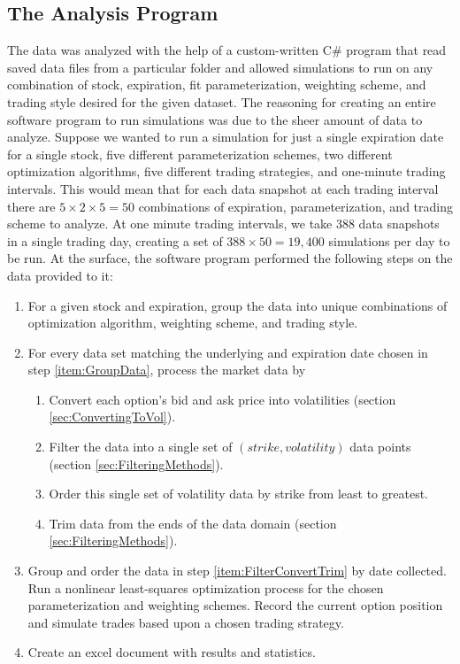 \documentclass[12pt, a4paper, notitlepage]{article}
\numberwithin{equation}{subsection}
\numberwithin{figure}{subsection}
\numberwithin{table}{subsection}
\newcommand{\newpar}{\newline \newline}
\begin{document}
\subsection{The Analysis Program}
The data was analyzed with the help of a custom-written C\# program that read saved data files from a particular folder and allowed simulations to run on any combination of stock, expiration, fit parameterization, weighting scheme, and trading style desired for the given dataset.
\newpar
The reasoning for creating an entire software program to run simulations was due to the sheer amount of data to analyze.  Suppose we wanted to run a simulation for just a single expiration date for a single stock, five different parameterization schemes, two different optimization algorithms, five different trading strategies, and one-minute trading intervals.  This would mean that for each data snapshot at each trading interval there are $5 \times 2 \times 5 = 50$ combinations of expiration, parameterization, and trading scheme to analyze.  At one minute trading intervals, we take 388 data snapshots in a single trading day, creating a set of $388 \times 50 = 19,400$ simulations per day to be run.
\newpar
At the surface, the software program performed the following steps on the data provided to it:
\begin{enumerate}
	\item For a given stock and expiration, group the data into unique combinations of optimization algorithm, weighting scheme, and trading style.\label{item:GroupData}
    \item For every data set matching the underlying and expiration date chosen in step \ref{item:GroupData}, process the market data by
    \begin{enumerate}
    	 \item Convert each option's bid and ask price into volatilities (section \ref{sec:ConvertingToVol}).
         \item Filter the data into a single set of $(strike, volatility)$ data points (section \ref{sec:FilteringMethods}).
         \item Order this single set of volatility data by strike from least to greatest.
         \item Trim data from the ends of the data domain (section \ref{sec:FilteringMethods}).\label{item:FilterConvertTrim}
    \end{enumerate}
	\item Group and order the data in step \ref{item:FilterConvertTrim} by date collected.  Run a nonlinear least-squares optimization process for the chosen parameterization and weighting schemes.  Record the current option position and simulate trades based upon a chosen trading strategy.
   \item Create an excel document with results and statistics.
\end{enumerate}
\end{document}
